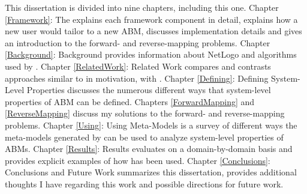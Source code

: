 This dissertation is divided into nine chapters, including this one.
Chapter \ref{Framework}: The \framework explains each framework component in detail, explains how a new user would tailor \fw to a new ABM, discusses implementation details and gives an introduction to the forward- and reverse-mapping problems.
Chapter \ref{Background}: Background provides information about NetLogo and algorithms used by \fw.
Chapter \ref{RelatedWork}: Related Work compares and contrasts approaches similar to \fw in motivation, with \fw.
Chapter \ref{Defining}: Defining System-Level Properties discusses the numerous different ways that system-level properties of ABM can be defined.
Chapters \ref{ForwardMapping} and \ref{ReverseMapping} discuss my solutions to the forward- and reverse-mapping problems.
Chapter \ref{Using}: Using Meta-Models is a survey of different ways the meta-models generated by \fw can be used to analyze system-level properties of ABMs.
Chapter \ref{Results}: Results evaluates \fw on a domain-by-domain basis and provides explicit examples of how \fw has been used.
Chapter \ref{Conclusions}: Conclusions and Future Work summarizes this dissertation, provides additional thoughts I have regarding this work and possible directions for future work.


 





